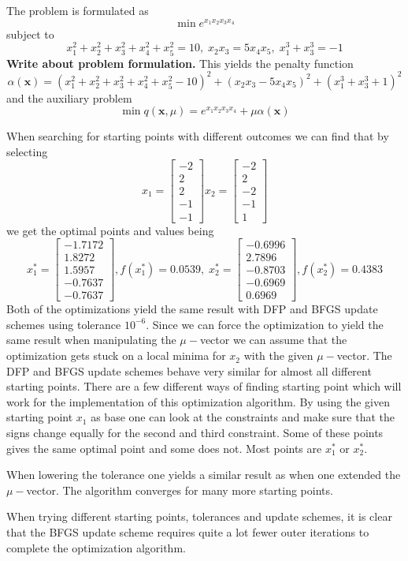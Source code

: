 
The problem is formulated as 
$$\min e^{x_1 x_2 x_3 x_4} $$ subject to $$x_1^2 + x_2^2 + x_3^2 + x_4^2 + x_5^2 = 10,\; x_2 x_3 = 5 x_4 x_5,\;x_1^3 + x_3^3 = -1$$
\textbf{Write about problem formulation.}
This yields the penalty function $$\alpha(\textbf{x}) = (x_1^2 + x_2^2 + x_3^2 + x_4^2 + x_5^2 - 10)^2+(x_2 x_3 - 5 x_4 x_5)^2 + (x_1^3 + x_3^3 +1)^2$$ and the auxiliary problem
$$\min q(\textbf{x},\mu) =  e^{x_1 x_2 x_3 x_4} + \mu\alpha(\textbf{x})$$

When searching for starting points with different outcomes we can find that by selecting 
$$x_1=\left[
\begin{array}{c}
-2\\2\\2\\-1\\-1
\end{array}
\right] x_2 =\left[
\begin{array}{c}
-2\\2\\-2\\-1\\1
\end{array}
\right] $$ we get the optimal points and values being $$x_1^*=
\left[
\begin{array}{c}
-1.7172\\1.8272\\1.5957\\-0.7637\\-0.7637
\end{array}
\right], f(x_1^*)=0.0539, \;x_2^* = \left[
\begin{array}{c}
-0.6996\\ 2.7896\\-0.8703\\-0.6969\\0.6969
\end{array}
\right],f(x_2^*)=0.4383$$
Both of the optimizations yield the same result with DFP and BFGS update schemes using tolerance $10^{-6}$. Since we can force the optimization to yield the same result when manipulating the $\mu-$vector we can assume that the optimization gets stuck on a local minima for $x_2$ with the given $\mu-$vector. The DFP and BFGS update schemes behave very similar for almost all different starting points. There are a few different ways of finding starting point which will work for the implementation of this optimization algorithm. By using the given starting point $x_1$ as base one can look at the constraints and make sure that the signs change equally for the second and third constraint. Some of these points gives the same optimal point and some does not. Most points are $x_1^*$ or $x_2^*$. 

When lowering the tolerance one yields a similar result as when one extended the $\mu-$vector. The algorithm converges for many more starting points.

When trying different starting points, tolerances and update schemes, it is clear that the BFGS update scheme requires quite a lot fewer outer iterations to complete the optimization algorithm. 

